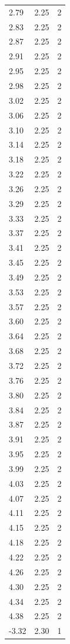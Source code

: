 \begin{longtable}{lrr}
  2.79 & 2.25 & 2 \\
  2.83 & 2.25 & 2 \\
  2.87 & 2.25 & 2 \\
  2.91 & 2.25 & 2 \\
  2.95 & 2.25 & 2 \\
  2.98 & 2.25 & 2 \\
  3.02 & 2.25 & 2 \\
  3.06 & 2.25 & 2 \\
  3.10 & 2.25 & 2 \\
  3.14 & 2.25 & 2 \\
  3.18 & 2.25 & 2 \\
  3.22 & 2.25 & 2 \\
  3.26 & 2.25 & 2 \\
  3.29 & 2.25 & 2 \\
  3.33 & 2.25 & 2 \\
  3.37 & 2.25 & 2 \\
  3.41 & 2.25 & 2 \\
  3.45 & 2.25 & 2 \\
  3.49 & 2.25 & 2 \\
  3.53 & 2.25 & 2 \\
  3.57 & 2.25 & 2 \\
  3.60 & 2.25 & 2 \\
  3.64 & 2.25 & 2 \\
  3.68 & 2.25 & 2 \\
  3.72 & 2.25 & 2 \\
  3.76 & 2.25 & 2 \\
  3.80 & 2.25 & 2 \\
  3.84 & 2.25 & 2 \\
  3.87 & 2.25 & 2 \\
  3.91 & 2.25 & 2 \\
  3.95 & 2.25 & 2 \\
  3.99 & 2.25 & 2 \\
  4.03 & 2.25 & 2 \\
  4.07 & 2.25 & 2 \\
  4.11 & 2.25 & 2 \\
  4.15 & 2.25 & 2 \\
  4.18 & 2.25 & 2 \\
  4.22 & 2.25 & 2 \\
  4.26 & 2.25 & 2 \\
  4.30 & 2.25 & 2 \\
  4.34 & 2.25 & 2 \\
  4.38 & 2.25 & 2 \\
  -3.32 & 2.30 & 1 \\

\end{longtable}
